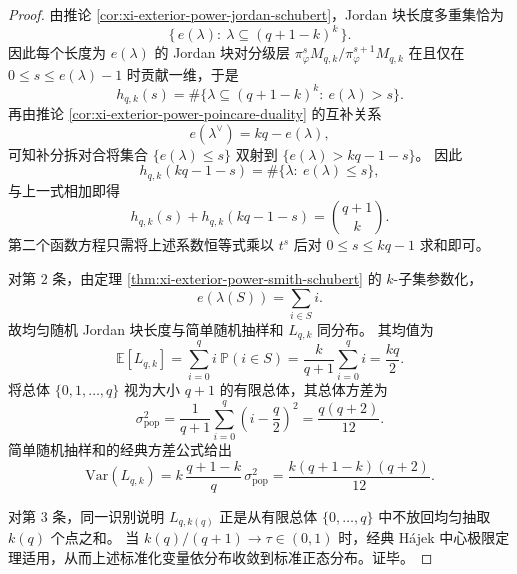 \begin{proof}
由推论 \ref{cor:xi-exterior-power-jordan-schubert}，Jordan 块长度多重集恰为
\[
\{\,e(\lambda):\ \lambda\subseteq (q+1-k)^k\,\}.
\]
因此每个长度为 \(e(\lambda)\) 的 Jordan 块对分级层
\(
\pi_\varphi^{s}M_{q,k}/\pi_\varphi^{s+1}M_{q,k}
\)
在且仅在 \(0\le s\le e(\lambda)-1\) 时贡献一维，于是
\[
h_{q,k}(s)=\#\{\lambda\subseteq (q+1-k)^k:\ e(\lambda)>s\}.
\]
再由推论 \ref{cor:xi-exterior-power-poincare-duality} 的互补关系
\[
e(\lambda^\vee)=kq-e(\lambda),
\]
可知补分拆对合将集合
\(
\{e(\lambda)\le s\}
\)
双射到
\(
\{e(\lambda)>kq-1-s\}
\)。
因此
\[
h_{q,k}(kq-1-s)
=
\#\{\lambda:\ e(\lambda)\le s\},
\]
与上一式相加即得
\[
h_{q,k}(s)+h_{q,k}(kq-1-s)=\binom{q+1}{k}.
\]
第二个函数方程只需将上述系数恒等式乘以 \(t^s\) 后对 \(0\le s\le kq-1\) 求和即可。

对第 \(2\) 条，由定理 \ref{thm:xi-exterior-power-smith-schubert} 的 \(k\)-子集参数化，
\[
e(\lambda(S))=\sum_{i\in S} i.
\]
故均匀随机 Jordan 块长度与简单随机抽样和
\(
L_{q,k}
\)
同分布。
其均值为
\[
\mathbb E[L_{q,k}]
=
\sum_{i=0}^{q} i\ \mathbb P(i\in S)
=
\frac{k}{q+1}\sum_{i=0}^{q} i
=
\frac{kq}{2}.
\]
将总体
\(
\{0,1,\dots,q\}
\)
视为大小 \(q+1\) 的有限总体，其总体方差为
\[
\sigma_{\mathrm{pop}}^2
=
\frac{1}{q+1}\sum_{i=0}^{q}\left(i-\frac{q}{2}\right)^2
=
\frac{q(q+2)}{12}.
\]
简单随机抽样和的经典方差公式给出
\[
\mathrm{Var}(L_{q,k})
=
k\,\frac{q+1-k}{q}\,\sigma_{\mathrm{pop}}^2
=
\frac{k(q+1-k)(q+2)}{12}.
\]

对第 \(3\) 条，同一识别说明 \(L_{q,k(q)}\) 正是从有限总体 \(\{0,\dots,q\}\) 中不放回均匀抽取 \(k(q)\) 个点之和。
当
\(
k(q)/(q+1)\to\tau\in(0,1)
\)
时，经典 Hájek 中心极限定理适用，从而上述标准化变量依分布收敛到标准正态分布。证毕。
\end{proof}

\endinput
